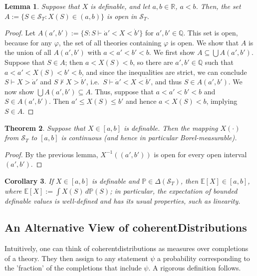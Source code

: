 \documentclass[12pt]{article}
\newcommand{\PP}{\mathbb{P}}
\newcommand{\vp}{\varphi}
\newcommand{\EE}{\mathbb{E}}
\newcommand{\RR}{\mathbb{R}}
\newcommand{\QQ}{\mathbb{Q}}
\newcommand{\cS}{\mathcal{S}}
\newcommand{\coh}{coherent}
\theoremstyle{plain}
\newtheorem{theorem}{Theorem}[subsection]
\newtheorem{lemma}[theorem]{Lemma}
\newtheorem{corollary}[theorem]{Corollary}
\theoremstyle{definition}
\theoremstyle{remark}
\begin{document}
\begin{lemma}
Suppose that $X$ is definable, and let $a,b\in\RR$, $a<b$. Then, the set $A := \{S\in\cS_T : X(S) \in (a,b)\}$ is open in $\cS_T$.
\end{lemma}
\begin{proof}
Let $A(a',b') := \{S : S\vdash\dot a' < X < \dot b'\}$ for $a',b'\in\QQ$. This set is open, because for any $\vp$, the set of all theories containing $\vp$ is open. We show that $A$ is the union of all $A(a',b')$ with $a < a' < b' < b$.
We first show $A \subseteq \bigcup A(a',b')$. Suppose that $S\in A$; then $a < X(S) < b$, so there are $a',b'\in\QQ$ such that $a<a'<X(S)<b'<b$, and since the inequalities are strict, we can conclude $S\vdash X > \dot a'$ and $S\nvdash X > \dot b'$, i.e.\ $S\vdash\dot a' < X < \dot b'$, and thus $S\in A(a',b')$.
We now show $\bigcup A(a',b')\subseteq A$. Thus, suppose that $a < a' < b' < b$ and $S\in A(a',b')$. Then $a' \le X(S) \le b'$ and hence $a < X(S) < b$, implying $S\in A$.
\end{proof}
\begin{theorem}
Suppose that $X\in[a,b]$ is definable. Then the mapping $X(\cdot)$ from $\cS_T$ to $[a,b]$ is continuous (and hence in particular Borel-measurable).
\end{theorem}
\begin{proof}
By the previous lemma, $X^{-1}((a',b'))$ is open for every open interval $(a',b')$.
\end{proof}
\begin{corollary}
If $X\in[a,b]$ is definable and $\PP\in\Delta(\cS_T)$, then $\EE[X]\in[a,b]$, where $\EE[X] := \int X(S)\,d\PP(S)$; in particular, the expectation of bounded definable values is well-defined and has its usual properties, such as linearity.
\end{corollary}
\subsection{An Alternative View of \coh Distributions} \label{An Alternative View of \coh Distributions}
Intuitively, one can think of \coh distributions as measures over completions of a theory. They then assign to any statement $\psi$ a probability corresponding to the 'fraction' of the completions that include $\psi$. A rigorous definition follows.
\end{document}
